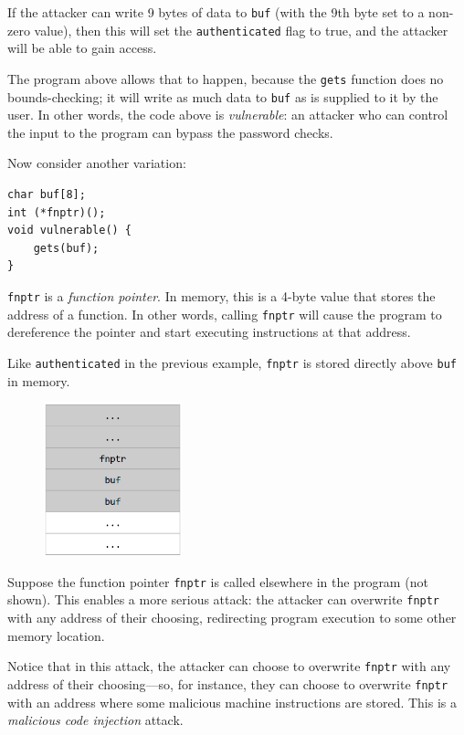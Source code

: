\documentclass[a4paper]{exam}
\theoremstyle{definition}
\begin{document}
If the attacker can write 9 bytes of data to \texttt{buf} (with the 9th
byte set to a non-zero value), then this will set the
\texttt{authenticated} flag to true, and the attacker will be able to
gain access.

The program above allows that to happen, because the \texttt{gets}
function does no bounds-checking; it will write as much data to
\texttt{buf} as is supplied to it by the user. In other words, the code
above is \emph{vulnerable}: an attacker who can control the input to the
program can bypass the password checks.

Now consider another variation:

\begin{verbatim}
char buf[8];
int (*fnptr)();
void vulnerable() {
    gets(buf);
}
\end{verbatim}


\texttt{fnptr} is a \emph{function pointer}. In memory, this is a 4-byte
value that stores the address of a function. In other words, calling
\texttt{fnptr} will cause the program to dereference the pointer and
start executing instructions at that address.

Like \texttt{authenticated} in the previous example, \texttt{fnptr} is
stored directly above \texttt{buf} in memory.

\begin{figure}
\centering
\includegraphics[width=4cm]{./img/overflow3.png}
\caption{}
\end{figure}

Suppose the function pointer \texttt{fnptr} is called elsewhere in the
program (not shown). This enables a more serious attack: the attacker
can overwrite \texttt{fnptr} with any address of their choosing,
redirecting program execution to some other memory location.

Notice that in this attack, the attacker can choose to overwrite
\texttt{fnptr} with any address of their choosing---so, for instance,
they can choose to overwrite \texttt{fnptr} with an address where some
malicious machine instructions are stored. This is a \emph{malicious
code injection} attack.
\end{document}
